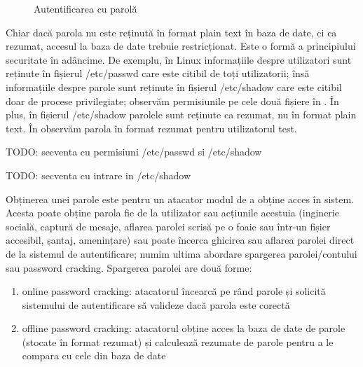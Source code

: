 \begin{figure}[htbp]
  \centering
  \def\svgwidth{\columnwidth}
  
  \caption{Autentificarea cu parolă}
  \label{fig:sec:password-authentication}
\end{figure}

Chiar dacă parola nu este reținută în format plain text în baza de date, ci ca rezumat, accesul la baza de date trebuie restricționat. Este o formă a principiului securitate în adâncime. De exemplu, în Linux informațiile despre utilizatori sunt reținute în fișierul /etc/passwd care este citibil de toți utilizatorii; însă informațiile despre parole sunt reținute în fișierul /etc/shadow care este citibil doar de procese privilegiate; observăm permisiunile pe cele două fișiere în . În plus, în fișierul /etc/shadow parolele sunt reținute ca rezumat, nu în format plain text. În  observăm parola în format rezumat pentru utilizatorul test.

\begin{screen}[caption={Permisiuni pe fișiere cu parole},label={lst:sec:password-files}]
TODO: secventa cu permisiuni /etc/passwd si /etc/shadow
\end{screen}

\begin{screen}[caption={Parolă în format rezumat (hash)},label={lst:sec:shadow}]
TODO: secventa cu intrare in /etc/shadow
\end{screen}

Obținerea unei parole este pentru un atacator modul de a obține acces în sistem. Acesta poate obține parola fie de la utilizator sau acțiunile acestuia (inginerie socială, captură de mesaje, aflarea parolei scrisă pe o foaie sau într-un fișier accesibil, șantaj, amenințare) sau poate încerca ghicirea sau aflarea parolei direct de la sistemul de autentificare; numim ultima abordare spargerea parolei/contului sau password cracking. Spargerea parolei are două forme:

\begin{enumerate}
  \item online password cracking: atacatorul încearcă pe rând parole și solicită sistemului de autentificare să valideze dacă parola este corectă
  \item offline password cracking: atacatorul obține acces la baza de date de parole (stocate în format rezumat) și calculează rezumate de parole pentru a le compara cu cele din baza de date
\end{enumerate}


